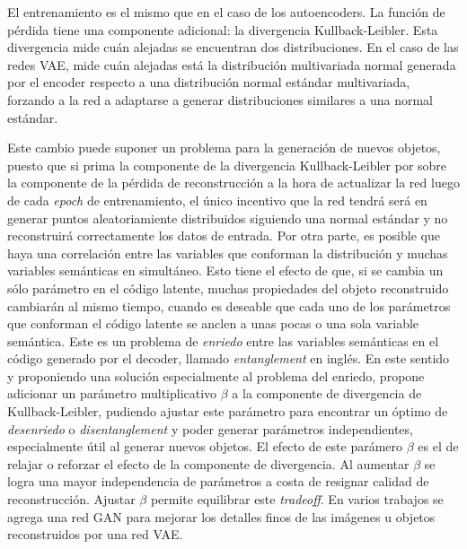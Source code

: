 \documentclass[spanish]{article}
\begin{document}
El entrenamiento es el mismo que en el caso de los autoencoders. La
función de pérdida tiene una componente adicional: la divergencia
Kullback-Leibler. %
Esta divergencia mide cuán alejadas se encuentran dos distribuciones.
En el caso de las redes VAE, mide cuán alejadas está la distribución
multivariada normal generada por el encoder respecto a una distribución
normal estándar multivariada, forzando a la red a adaptarse a generar
distribuciones similares a una normal estándar.

Este cambio puede suponer un problema para la generación de nuevos
objetos, puesto que si prima la componente de la divergencia
Kullback-Leibler por sobre la componente de la pérdida de reconstrucción
a la hora de actualizar la red luego de cada \textit{epoch} de
entrenamiento, el único incentivo que la red tendrá será en generar
puntos aleatoriamiente distribuidos siguiendo una normal estándar y
no reconstruirá correctamente los datos de entrada. Por otra parte,
es posible que haya una correlación entre las variables que conforman
la distribución y muchas variables semánticas en simultáneo. Esto
tiene el efecto de que, si se cambia un sólo parámetro en el código
latente, muchas propiedades del objeto reconstruido cambiarán al
mismo tiempo, cuando es deseable que cada uno de los parámetros que
conforman el código latente se anclen a unas pocas o una sola
variable semántica. %
Este es un problema de \textit{enriedo} entre las variables semánticas
en el código generado por el decoder, llamado \textit{entanglement} en
inglés.
En este sentido y proponiendo una solución especialmente al problema
del enriedo, \cite{Higgins2017} propone adicionar un parámetro
multiplicativo \(\beta\) a la componente de divergencia de
Kullback-Leibler, pudiendo ajustar este parámetro para encontrar un
óptimo de \textit{desenriedo} o \textit{disentanglement} y poder
generar parámetros independientes, especialmente útil al generar
nuevos objetos. El efecto de este parámero \(\beta\) es el de
relajar o reforzar el efecto de la componente de divergencia.
Al aumentar \(\beta\) se logra una mayor independencia de parámetros
a costa de resignar calidad de reconstrucción. Ajustar \(\beta\)
permite equilibrar este \textit{tradeoff}. En varios trabajos
se agrega una red GAN para mejorar los detalles finos de las imágenes
u objetos reconstruidos por una red VAE.
\end{document}
